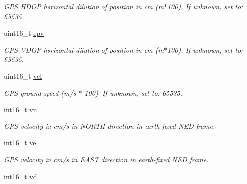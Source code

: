 \begin{DoxyCompactItemize}
\begin{DoxyCompactList}\small\item\em G\+P\+S H\+D\+O\+P horizontal dilution of position in cm (m$\ast$100). If unknown, set to\+: 65535. \end{DoxyCompactList}\item 
\hypertarget{struct____mavlink__hil__gps__t_aaf9040cabae429efd2901d51ee3a4969}{uint16\+\_\+t \hyperlink{struct____mavlink__hil__gps__t_aaf9040cabae429efd2901d51ee3a4969}{epv}}\label{struct____mavlink__hil__gps__t_aaf9040cabae429efd2901d51ee3a4969}

\begin{DoxyCompactList}\small\item\em G\+P\+S V\+D\+O\+P horizontal dilution of position in cm (m$\ast$100). If unknown, set to\+: 65535. \end{DoxyCompactList}\item 
\hypertarget{struct____mavlink__hil__gps__t_ac586576e58891b09ca979d421465ac81}{uint16\+\_\+t \hyperlink{struct____mavlink__hil__gps__t_ac586576e58891b09ca979d421465ac81}{vel}}\label{struct____mavlink__hil__gps__t_ac586576e58891b09ca979d421465ac81}

\begin{DoxyCompactList}\small\item\em G\+P\+S ground speed (m/s $\ast$ 100). If unknown, set to\+: 65535. \end{DoxyCompactList}\item 
\hypertarget{struct____mavlink__hil__gps__t_aff2b255f76bb2f80ccc690d70c11195b}{int16\+\_\+t \hyperlink{struct____mavlink__hil__gps__t_aff2b255f76bb2f80ccc690d70c11195b}{vn}}\label{struct____mavlink__hil__gps__t_aff2b255f76bb2f80ccc690d70c11195b}

\begin{DoxyCompactList}\small\item\em G\+P\+S velocity in cm/s in N\+O\+R\+T\+H direction in earth-\/fixed N\+E\+D frame. \end{DoxyCompactList}\item 
\hypertarget{struct____mavlink__hil__gps__t_a7c3f8d60cff9df9d2d03b3ac84bbfb15}{int16\+\_\+t \hyperlink{struct____mavlink__hil__gps__t_a7c3f8d60cff9df9d2d03b3ac84bbfb15}{ve}}\label{struct____mavlink__hil__gps__t_a7c3f8d60cff9df9d2d03b3ac84bbfb15}

\begin{DoxyCompactList}\small\item\em G\+P\+S velocity in cm/s in E\+A\+S\+T direction in earth-\/fixed N\+E\+D frame. \end{DoxyCompactList}\item 
\hypertarget{struct____mavlink__hil__gps__t_a3d764d688357582b0aba5da4992579b5}{int16\+\_\+t \hyperlink{struct____mavlink__hil__gps__t_a3d764d688357582b0aba5da4992579b5}{vd}}\label{struct____mavlink__hil__gps__t_a3d764d688357582b0aba5da4992579b5}


\end{DoxyCompactItemize}
